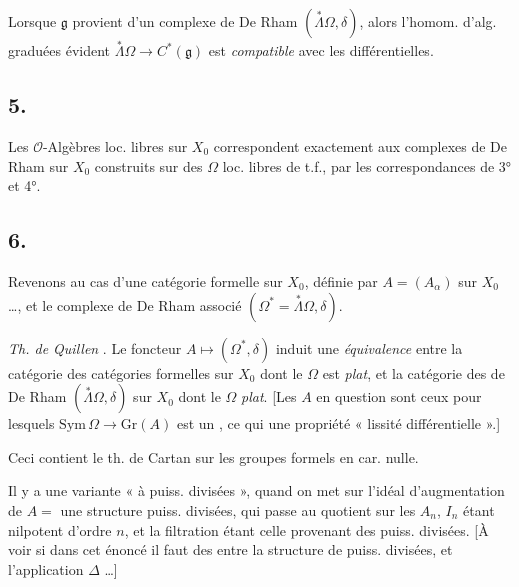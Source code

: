 \documentclass[11pt,a4paper]{article}
\begin{document}
Lorsque $\mathfrak{g}$ provient d'un complexe de De Rham
$(\overset{*}{\Lambda}\Omega, \delta)$, alors l'homom. d'alg. graduées
évident $\overset{*}{\Lambda}\Omega \to C^{*}(\mathfrak{g})$ est
\emph{compatible} avec les  différentielles.

\subsection*{5.}

Les $\mathcal{O}$-Algèbres loc. libres  
sur $X_0$ correspondent exactement aux complexes de De Rham sur $X_0$
construits sur des $\Omega$ loc. libres de t.f., par les correspondances de
3° et 4°.

\subsection*{6.}

Revenons au cas d'une catégorie formelle sur $X_0$, définie par
$A = (A_\alpha)$ sur $X_0$ …, et le complexe de De Rham associé
$(\Omega^* = \overset{*}{\Lambda}\Omega, \delta)$.

\emph{Th. de Quillen} . Le
foncteur $A \mapsto (\Omega^*, \delta)$ induit une \emph{équivalence} entre
la catégorie des catégories formelles  sur $X_0$ dont le
$\Omega$ est \emph{plat}, et la catégorie des 
 de De Rham $(\overset{*}{\Lambda}\Omega, \delta)$ sur $X_0$
dont le $\Omega$  \emph{plat}. [Les $A$ en question sont ceux pour
lesquels $\mathrm{Sym}\,\Omega \to \mathrm{Gr}(A)$ est un
, ce qui  une
propriété  « lissité différentielle ».]

Ceci contient le th. de Cartan sur les groupes formels en car. nulle.

Il y a une variante « à puiss. divisées », quand on met sur l'idéal
d'augmentation de $A = $  une structure
  puiss. divisées, qui passe au quotient sur
les $A_n$,  $I_n$ étant nilpotent d'ordre $n$, et la
filtration étant celle provenant des puiss. divisées. [À voir si dans
cet énoncé il faut  des  entre la
structure de puiss. divisées, et l'application $\Delta$ …]
\end{document}
